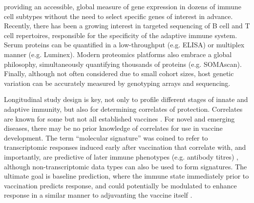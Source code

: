 providing an accessible, global measure of gene expression in dozens of immune cell subtypes without the need to select specific genes of interest in advance.
Recently, there has been a growing interest in targeted sequencing of B cell and T cell repertoires, responsible for the specificity of the adaptive immune system.
Serum proteins can be quantified in a low-throughput (e.g. \gls{ELISA}) or multiplex manner (e.g. Luminex).
Modern proteomics platforms also embrace a global philosophy, simultaneously quantifying thousands of proteins (e.g. SOMAscan). 
Finally, although not often considered due to small cohort sizes, host genetic variation can be accurately measured by genotyping arrays and sequencing. 
%
%

Longitudinal study design is key, not only to profile different stages of innate and adaptive immunity, but also for determining correlates of protection.
Correlates are known for some but not all established vaccines \autocite{siegrist2018VaccineImmunology,plotkin2018CorrelatesProtection}.
For novel and emerging diseases, there may be no prior knowledge of correlates for use in vaccine development.
The term \enquote{molecular signature} was coined to refer to transcriptomic responses induced early after vaccination that correlate with, and importantly, are predictive of later immune phenotypes (e.g. antibody titres) \autocite{pulendran2010SystemsVaccinology}, 
although non-transcriptomic data types can also be used to form signatures.
The ultimate goal is baseline prediction, where the immune state immediately prior to vaccination predicts response, 
and could potentially be modulated to enhance response in a similar manner to adjuvanting the vaccine itself \autocite{tsang2020ImprovingVaccineinducedImmunity}. 

